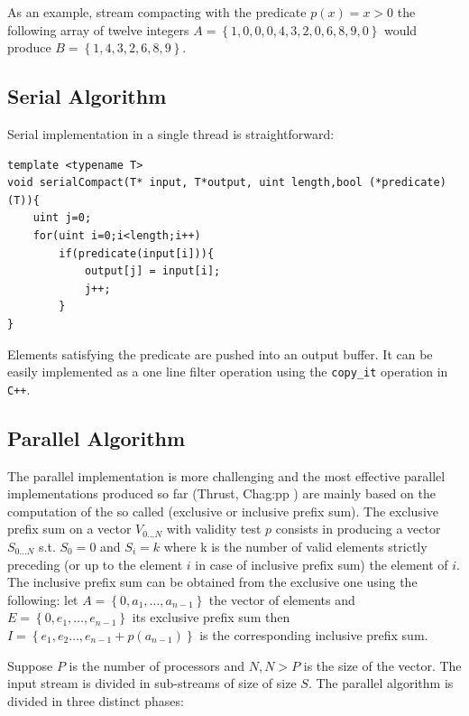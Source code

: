 As an example, stream  compacting with the predicate \(p(x) = x >0 \) the following  array of twelve integers \(A=\left\{1,0,0,0,4,3,2,0,6,8,9,0\right\}\) would produce \(B=\left\{1,4,3,2,6,8,9\right\}\).

\subsection{Serial Algorithm}
Serial implementation in a single thread is straightforward:
\begin{lstlisting}
template <typename T>
void serialCompact(T* input, T*output, uint length,bool (*predicate)(T)){
	uint j=0;
	for(uint i=0;i<length;i++)
		if(predicate(input[i])){
			output[j] = input[i];
			j++;
		}
}	
\end{lstlisting}
Elements satisfying the predicate are pushed into an output buffer. It can be easily implemented as a one line filter operation using the \texttt{copy\_it} operation in \texttt{C++}.

\subsection{Parallel Algorithm}
\label{sec:stream_compaction_parallel}
The parallel implementation is more challenging and the most effective parallel implementations produced so far (Thrust\cite{Thrust}, Chag:pp \cite{Billetter:2009}) are mainly based on the computation of the so called (exclusive or inclusive prefix sum). The exclusive prefix sum on a vector \(V_{0\ldots N}\) with validity test \(p\) consists in producing a vector \(S_{0\ldots N}\) s.t. \(S_0 = 0\) and \(S_i=k\) where k is the number of valid elements strictly preceding (or up to the element \(i\) in case of inclusive prefix sum) the element of \(i\). The inclusive prefix sum can be obtained from the exclusive one using the following: let \(A=\left\{0,a_1,\ldots,a_{n-1}\right\}\) the vector of elements and \(E=\left\{0,e_1,\ldots,e_{n-1}\right\}\) its exclusive prefix sum then \(I=\left\{e_1,e_2\ldots, e_{n-1}+p(a_{n-1}) \right\}\) is the corresponding inclusive prefix sum.

Suppose \(P\) is the number of processors and \(N, N>P \) is the size of the vector. The input stream is divided in sub-streams  of size of size \(S\). The parallel algorithm is divided in three distinct phases:

